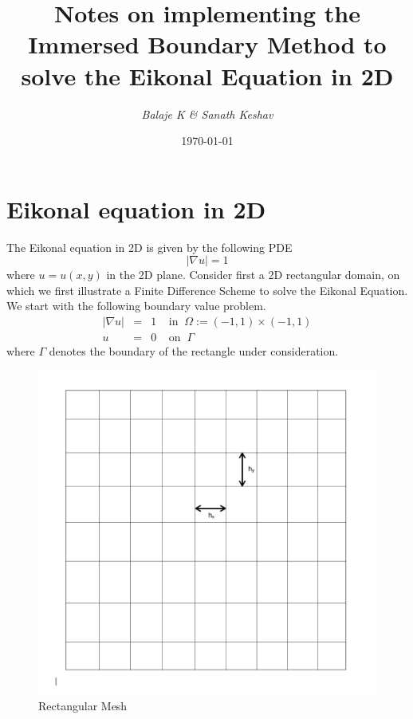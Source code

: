 \documentclass[11pt]{report}
\begin{document}
    \title{\textbf{Notes on implementing the Immersed Boundary Method to solve the Eikonal Equation in 2D}}
    \author{\textit{Balaje K \& Sanath Keshav}}
    \date{\today}
    \maketitle

\tableofcontents

\chapter{Eikonal equation in 2D}

The Eikonal equation in 2D is given by the following PDE
\begin{equation}
  |\nabla u| = 1
\end{equation}
where $u = u(x,y)$ in the 2D plane. Consider first a 2D rectangular domain, on which we first illustrate a Finite Difference Scheme to solve the Eikonal Equation. We start with the following boundary value problem.
\begin{eqnarray}
  |\nabla u| &=& 1 \;\;\;\; \text{in} \;\; \Omega := (-1,1) \times (-1,1)\\ \label{eq:1}
  u &=& 0 \;\;\;\; \text{on} \;\; \Gamma
\end{eqnarray}
where $\Gamma$ denotes the boundary of the rectangle under consideration.
\begin{figure}[h!]
  \centering
  \includegraphics[scale=0.5]{rect.png}
  \caption{Rectangular Mesh}
  \label{fig:1}
\end{figure}\\
\end{document}

